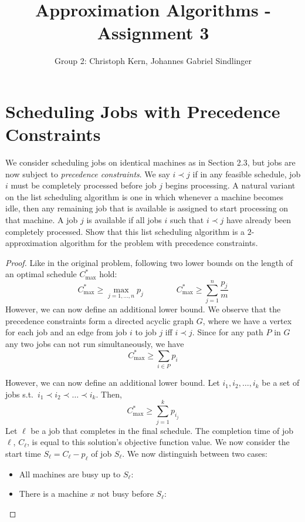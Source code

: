 \documentclass{article}
\title{Approximation Algorithms - Assignment 3}
\author{Group 2: Christoph Kern, Johannes Gabriel Sindlinger}
\begin{document}
\maketitle

\section{Scheduling Jobs with Precedence Constraints}
We consider scheduling jobs on identical machines as in Section 2.3, but jobs are now subject to \emph{precedence constraints}. We say $i \prec j$ if in any feasible schedule, job $i$ must be completely processed before job $j$ begins processing. A natural variant on the list scheduling algorithm is one in which whenever a machine becomes idle, then any remaining job that is available is assigned to start processing on that machine. A job $j$ is available if all jobs $i$ such that $i \prec j$ have already been completely processed. Show that this list scheduling algorithm is a $2$-approximation algorithm for the problem with precedence constraints.

\begin{proof}
    Like in the original problem, following two lower bounds on the length of an optimal schedule $C^*_{\max}$ hold:
    \[
        C^*_{\max} \ge \max_{j=1,\dots,n}p_j
        \quad\quad\quad\quad
        C^*_{\max} \ge \sum^n_{j=1}\frac{p_j}{m}
    \]
    However, we can now define an additional lower bound. We observe that the precedence constraints form a directed acyclic graph $G$, where we have a vertex for each job and an edge from job $i$ to job $j$ iff $i \prec j$. Since for any path $P$ in $G$ any two jobs can not run simultaneously, we have
    \[
        C^*_{\max} \ge \sum_{i \in P} p_{i}
    \]

    
    However, we can now define an additional lower bound. Let $i_1,i_2, \dots, i_k$ be a set of jobs s.t.~$i_1 \prec i_2 \prec \dots \prec i_k$. Then,
    \[
        C^*_{\max} \ge \sum_{j = 1}^k p_{i_j}
    \]
    Let $\ell$ be a job that completes in the final schedule. The completion time of job $\ell$, $C_\ell$, is equal to this solution's objective function value. We now consider the start time $S_\ell = C_\ell - p_\ell$ of job $S_\ell$. We now distinguish between two cases:
    \begin{itemize}
        \item All machines are busy up to $S_\ell$:
        \item There is a machine $x$ not busy before $S_\ell$:
        
    \end{itemize}
\end{proof}
\end{document}
